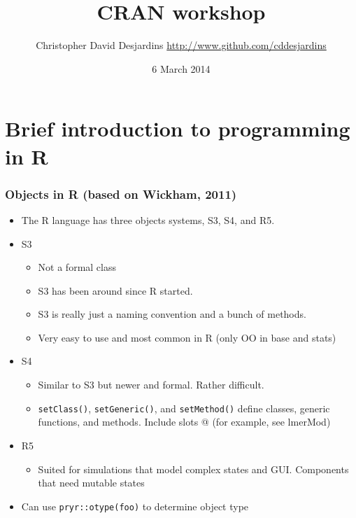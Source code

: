 \documentclass[xcolor=svgnames]{beamer}
\title{CRAN workshop}
\author{Christopher David Desjardins
\url{http://www.github.com/cddesjardins}}
\date{6 March 2014}
\begin{document}
\frame{\titlepage}
  

\section{Brief introduction to programming in R}


\begin{frame}
  \frametitle{Objects in R (based on Wickham, 2011)}
  \begin{itemize}
  \item The R language has three objects systems, S3, S4, and R5.
  \item S3
    \begin{itemize}
      \item Not a formal class
      \item S3 has been around since R started.
      \item S3 is really just a naming convention and a bunch of methods.
        \item Very easy to use and most common in R (only OO in base and stats)
   \end{itemize}
  \item S4
    \begin{itemize}
      \item Similar to S3 but newer and formal. Rather difficult.
        \item \texttt{setClass()}, \texttt{setGeneric()}, and \texttt{setMethod()} define classes, generic functions, and methods. Include slots @ (for example, see lmerMod)
    \end{itemize}
    \item R5
      \begin{itemize}
        \item Suited for simulations that model complex states and GUI. Components that need mutable states
      \end{itemize}
      \item Can use \texttt{pryr::otype(foo)} to determine object type
  \end{itemize}
\end{frame}
\end{document}
